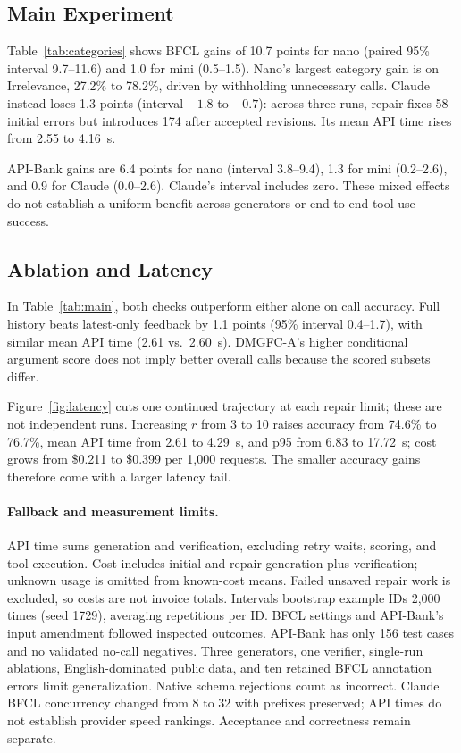 \subsection{Main Experiment}
Table~\ref{tab:categories} shows BFCL gains of 10.7 points for nano (paired 95\% interval 9.7--11.6) and 1.0 for mini (0.5--1.5). Nano's largest category gain is on Irrelevance, 27.2\% to 78.2\%, driven by withholding unnecessary calls. Claude instead loses 1.3 points (interval $-1.8$ to $-0.7$): across three runs, repair fixes 58 initial errors but introduces 174 after accepted revisions. Its mean API time rises from 2.55 to 4.16~s.

API-Bank gains are 6.4 points for nano (interval 3.8--9.4), 1.3 for mini (0.2--2.6), and 0.9 for Claude (0.0--2.6). Claude's interval includes zero. These mixed effects do not establish a uniform benefit across generators or end-to-end tool-use success.

\subsection{Ablation and Latency}
In Table~\ref{tab:main}, both checks outperform either alone on call accuracy. Full history beats latest-only feedback by 1.1 points (95\% interval 0.4--1.7), with similar mean API time (2.61 vs.\ 2.60~s). DMGFC-A's higher conditional argument score does not imply better overall calls because the scored subsets differ.


Figure~\ref{fig:latency} cuts one continued trajectory at each repair limit; these are not independent runs. Increasing $r$ from 3 to 10 raises accuracy from 74.6\% to 76.7\%, mean API time from 2.61 to 4.29~s, and p95 from 6.83 to 17.72~s; cost grows from \$0.211 to \$0.399 per 1,000 requests. The smaller accuracy gains therefore come with a larger latency tail.

\paragraph{Fallback and measurement limits.}
API time sums generation and verification, excluding retry waits, scoring, and tool execution. Cost includes initial and repair generation plus verification; unknown usage is omitted from known-cost means. Failed unsaved repair work is excluded, so costs are not invoice totals. Intervals bootstrap example IDs 2,000 times (seed 1729), averaging repetitions per ID. BFCL settings and API-Bank's input amendment followed inspected outcomes. API-Bank has only 156 test cases and no validated no-call negatives. Three generators, one verifier, single-run ablations, English-dominated public data, and ten retained BFCL annotation errors limit generalization. Native schema rejections count as incorrect. Claude BFCL concurrency changed from 8 to 32 with prefixes preserved; API times do not establish provider speed rankings. Acceptance and correctness remain separate.
